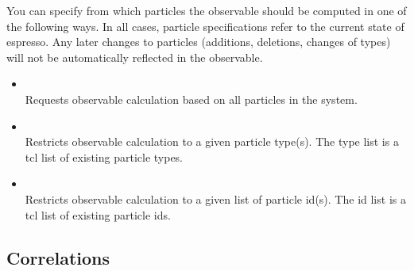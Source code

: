 You can specify from which particles the observable should be computed in one of 
the following ways. In all cases, particle specifications refer to the current
state of espresso. Any later changes to particles (additions, deletions, changes
of types) will not be automatically reflected in the observable.
  \begin{itemize}
    \item {} \\
          Requests observable calculation based on all particles in the system.
    \item {}  \\
          Restricts observable calculation to a given particle type(s). The type
	  list is a tcl list of existing particle types.
    \item {}  \\
          Restricts observable calculation to a given list of particle id(s). The id 
	  list is a tcl list of existing particle ids.
  \end{itemize}


\subsection{Correlations}
\label{ssec:correlations}


